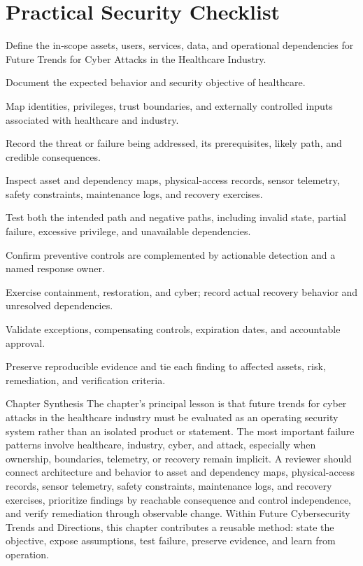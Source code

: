 \documentclass[11pt,letterpaper]{article}
\begin{document}
\section*{Practical Security Checklist}
\begin{CornellChecklist}
\item Define the in-scope assets, users, services, data, and operational dependencies for Future Trends for Cyber Attacks in the Healthcare Industry.
\item Document the expected behavior and security objective of healthcare.
\item Map identities, privileges, trust boundaries, and externally controlled inputs associated with healthcare and industry.
\item Record the threat or failure being addressed, its prerequisites, likely path, and credible consequences.
\item Inspect asset and dependency maps, physical-access records, sensor telemetry, safety constraints, maintenance logs, and recovery exercises.
\item Test both the intended path and negative paths, including invalid state, partial failure, excessive privilege, and unavailable dependencies.
\item Confirm preventive controls are complemented by actionable detection and a named response owner.
\item Exercise containment, restoration, and cyber; record actual recovery behavior and unresolved dependencies.
\item Validate exceptions, compensating controls, expiration dates, and accountable approval.
\item Preserve reproducible evidence and tie each finding to affected assets, risk, remediation, and verification criteria.
\end{CornellChecklist}
\begin{CornellSummaryBox}{Chapter Synthesis}
The chapter's principal lesson is that future trends for cyber attacks in the healthcare industry must be evaluated as an operating security system rather than an isolated product or statement. The most important failure patterns involve healthcare, industry, cyber, and attack, especially when ownership, boundaries, telemetry, or recovery remain implicit. A reviewer should connect architecture and behavior to asset and dependency maps, physical-access records, sensor telemetry, safety constraints, maintenance logs, and recovery exercises, prioritize findings by reachable consequence and control independence, and verify remediation through observable change. Within Future Cybersecurity Trends and Directions, this chapter contributes a reusable method: state the objective, expose assumptions, test failure, preserve evidence, and learn from operation.
\end{CornellSummaryBox}
\end{document}
